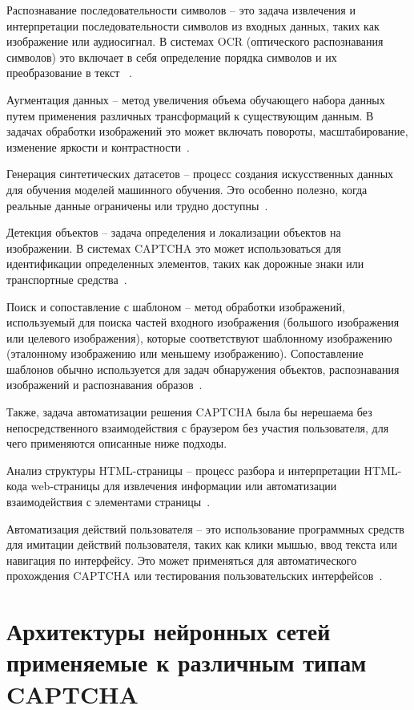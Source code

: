 Распознавание последовательности символов -- это задача извлечения и 
интерпретации последовательности символов из входных данных, таких как 
изображение или аудиосигнал. В системах OCR (оптического распознавания символов) 
это включает в себя определение порядка символов и их преобразование в текст
~\cite{ocr}.

Аугментация данных -- метод увеличения объема обучающего набора данных путем 
применения различных трансформаций к существующим данным. В задачах обработки 
изображений это может включать повороты, масштабирование, изменение яркости и 
контрастности~\cite{augmentation}.

Генерация синтетических датасетов -- процесс создания искусственных данных для 
обучения моделей машинного обучения. Это особенно полезно, когда реальные данные 
ограничены или трудно доступны~\cite{gendataset}.

Детекция объектов -- задача определения и локализации объектов на изображении. В 
системах CAPTCHA это может использоваться для идентификации определенных 
элементов, таких как дорожные знаки или транспортные средства~\cite{detection}.

Поиск и сопоставление с шаблоном -- метод обработки изображений, используемый 
для поиска частей входного изображения (большого изображения или целевого 
изображения), которые соответствуют шаблонному изображению (эталонному 
изображению или меньшему изображению). Сопоставление шаблонов обычно 
используется для задач обнаружения объектов, распознавания изображений и 
распознавания образов~\cite{templatematching}.

Также, задача автоматизации решения CAPTCHA была бы нерешаема без 
непосредственного взаимодействия с браузером без участия пользователя, для чего 
применяются описанные ниже подходы.

Анализ структуры HTML-страницы -- процесс разбора и интерпретации HTML-кода 
web-страницы для извлечения информации или автоматизации взаимодействия с 
элементами страницы~\cite{parsing}.

Автоматизация действий пользователя -- это использование программных средств для 
имитации действий пользователя, таких как клики мышью, ввод текста или навигация 
по интерфейсу. Это может применяться для автоматического прохождения CAPTCHA или 
тестирования пользовательских интерфейсов~\cite{automatization}.

\section{Архитектуры нейронных сетей применяемые к различным типам CAPTCHA}

